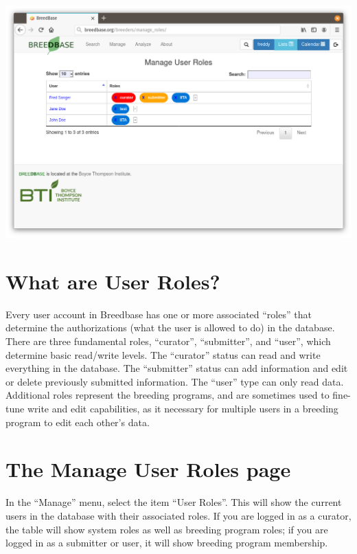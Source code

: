 \documentclass[
  12pt,
]{book}
\begin{document}
\begin{center}\includegraphics[width=0.95\linewidth]{assets/images/manage_user_roles_page} \end{center}

\hypertarget{what-are-user-roles}{%
\section{What are User Roles?}\label{what-are-user-roles}}

Every user account in Breedbase has one or more associated ``roles'' that determine the authorizations (what the user is allowed to do) in the database. There are three fundamental roles, ``curator'', ``submitter'', and ``user'', which determine basic read/write levels. The ``curator'' status can read and write everything in the database. The ``submitter'' status can add information and edit or delete previously submitted information. The ``user'' type can only read data. Additional roles represent the breeding programs, and are sometimes used to fine-tune write and edit capabilities, as it necessary for multiple users in a breeding program to edit each other's data.

\hypertarget{the-manage-user-roles-page}{%
\section{The Manage User Roles page}\label{the-manage-user-roles-page}}

In the ``Manage'' menu, select the item ``User Roles''. This will show the current users in the database with their associated roles. If you are logged in as a curator, the table will show system roles as well as breeding program roles; if you are logged in as a submitter or user, it will show breeding program membership.
\end{document}
